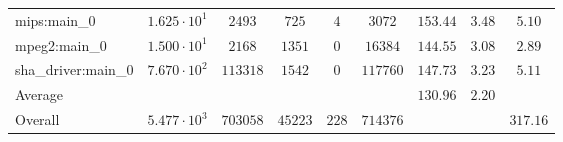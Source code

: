 \begin{tabular}{|l|c|c|c|c|c|c|c|c|}
mips:main\_0            & $ 1.625 \cdot 10^{1}  $ & $ 2493   $ & $ 725   $ & $ 4   $ & $ 3072   $ & $ 153.44      $ & $ 3.48    $ & $ 5.10    $ \\
mpeg2:main\_0           & $ 1.500 \cdot 10^{1}  $ & $ 2168   $ & $ 1351  $ & $ 0   $ & $ 16384  $ & $ 144.55      $ & $ 3.08    $ & $ 2.89    $ \\
sha\_driver:main\_0     & $ 7.670 \cdot 10^{2}  $ & $ 113318 $ & $ 1542  $ & $ 0   $ & $ 117760 $ & $ 147.73      $ & $ 3.23    $ & $ 5.11    $ \\
\hline
Average                 & $                     $ & $        $ & $       $ & $     $ & $        $ & $ 130.96      $ & $ 2.20    $ & $         $ \\
\hline
Overall                 & $ 5.477 \cdot 10^{3}  $ & $ 703058 $ & $ 45223 $ & $ 228 $ & $ 714376 $ & $             $ & $         $ & $ 317.16  $ \\
\hline
\end{tabular}
